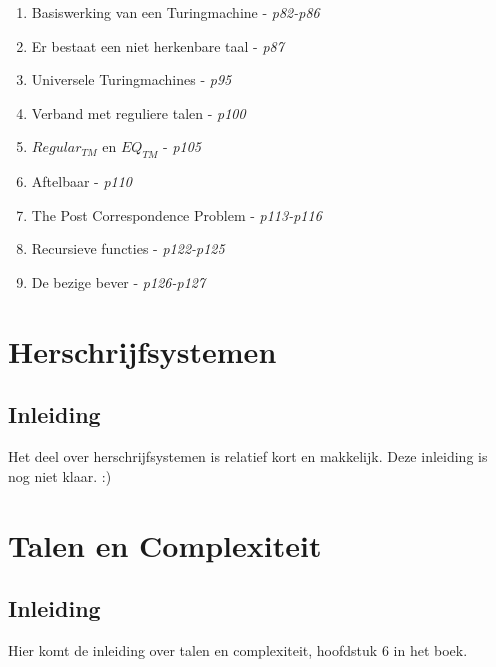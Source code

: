 \documentclass[10pt,a4paper]{article}
\begin{document}
\begin{enumerate}
	\item Basiswerking van een Turingmachine - \emph{p82-p86}
	\item Er bestaat een niet herkenbare taal - \emph{p87}
	\item Universele Turingmachines - \emph{p95}
	\item Verband met reguliere talen - \emph{p100}
	\item $Regular_{TM}$ en $EQ_{TM}$ - \emph{p105}
	\item Aftelbaar - \emph{p110}
	\item The Post Correspondence Problem - \emph{p113-p116}
	\item Recursieve functies - \emph{p122-p125}
	\item De bezige bever - \emph{p126-p127}
\end{enumerate}









\newpage
\section{Herschrijfsystemen}

\subsection{Inleiding}

Het deel over herschrijfsystemen is relatief kort en makkelijk. Deze inleiding is nog niet klaar. :)





\newpage
\section{Talen en Complexiteit}

\subsection{Inleiding}

Hier komt de inleiding over talen en complexiteit, hoofdstuk 6 in het boek.


\end{document}
